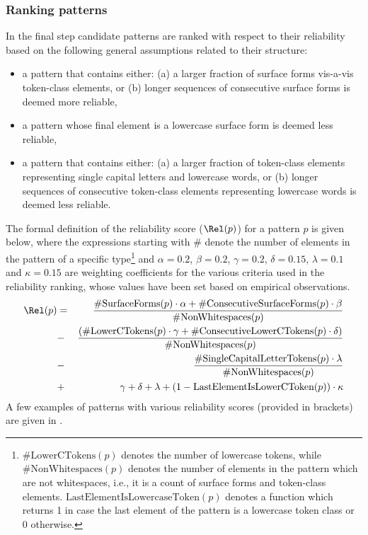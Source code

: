 \documentclass[output=paper]{langsci/langscibook}
\begin{document}
\subsubsection{Ranking patterns} In the final step candidate patterns are ranked with respect to their reliability based on the
following general assumptions related to their structure: 
\begin{itemize}
\item a pattern that contains either: (a) a larger fraction of surface forms vis-a-vis token-class elements, or (b) longer sequences of consecutive surface forms is deemed more reliable,
\item a pattern whose final element is a lowercase surface form is deemed less reliable,
\item a pattern that contains either: (a) a larger fraction of token-class elements representing single capital letters and lowercase words,
or (b) longer sequences of consecutive token-class elements representing lowercase words is deemed less reliable.
\end{itemize}

The formal definition of the reliability score ($\Rel(p)$) for a pattern $p$ is given below, where the expressions starting with $\#$ denote the number of elements in the pattern of a specific type\footnote{$\#\text{LowerCTokens}(p)$ denotes the number of lowercase tokens, while $\#\text{NonWhitespaces}(p)$ denotes the number of elements in the pattern which are not whitespaces, i.e., it is a count of surface forms and token-class elements. $\text{LastElementIsLowercaseToken}(p)$ denotes a function which returns 1 in case the last element of the pattern is a lowercase token class or 0 otherwise.} and $\alpha=0.2$, $\beta=0.2$, $\gamma=0.2$, $\delta=0.15$, $\lambda=0.1$ and $\kappa=0.15$ are weighting coefficients for the various criteria used in the reliability ranking, whose values have been set based on empirical observations.  
\begin{eqnarray*}
\Rel(p) & = & \frac{\#\text{SurfaceForms}(p) \cdot \alpha +
  \#\text{ConsecutiveSurfaceForms}(p) \cdot \beta}{\#\text{NonWhitespaces}(p)} \\ &
- & \frac{(\#\text{LowerCTokens}(p) \cdot \gamma +
  \#\text{ConsecutiveLowerCTokens}(p) \cdot \delta)}{\#\text{NonWhitespaces}(p)}\\ &
- & \frac{\#\text{SingleCapitalLetterTokens}(p) \cdot
  \lambda}{\#\text{NonWhitespaces}(p)}\\ & + & \gamma + \delta + \lambda + (1
- \text{LastElementIsLowerCToken}(p)) \cdot \kappa \\
\end{eqnarray*}
A few examples of patterns with various reliability scores
(provided in brackets) are given in .
\end{document}
